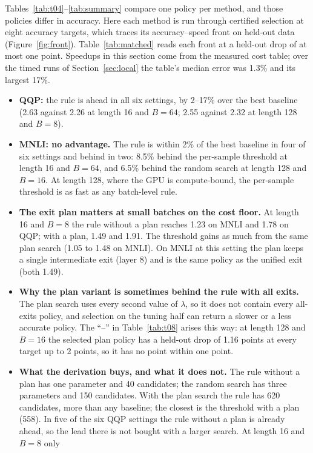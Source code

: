 Tables~\ref{tab:t04}--\ref{tab:summary} compare one policy per method, and those policies differ in accuracy. Here
each method is run through certified selection at eight accuracy targets, which traces its accuracy--speed front on
held-out data (Figure~\ref{fig:front}). Table~\ref{tab:matched} reads each front at a held-out drop of at most one
point. Speedups in this section come from the measured cost table; over the timed runs of Section~\ref{sec:local}
the table's median error was 1.3\% and its largest 17\%.
\begin{itemize}
  \item \textbf{QQP:} the rule is ahead in all six settings, by 2--17\% over the best baseline (2.63\x{} against
  2.26\x{} at length 16 and $B=64$; 2.55\x{} against 2.32\x{} at length 128 and $B=8$).
  \item \textbf{MNLI: no advantage.} The rule is within 2\% of the best baseline in four of six settings and behind
  in two: 8.5\% behind the per-sample threshold at length 16 and $B=64$, and 6.5\% behind the random search at length
  128 and $B=16$. At length 128, where the GPU is compute-bound, the per-sample threshold is as fast as any
  batch-level rule.
  \item \textbf{The exit plan matters at small batches on the cost floor.} At length 16 and $B=8$ the rule without a
  plan reaches 1.23\x{} on MNLI and 1.78\x{} on QQP; with a plan, 1.49\x{} and 1.91\x. The threshold gains as much
  from the same plan search (1.05\x{} to 1.48\x{} on MNLI). On MNLI at this setting the plan keeps a single
  intermediate exit (layer 8) and is the same policy as the unified exit (both 1.49\x).
  \item \textbf{Why the plan variant is sometimes behind the rule with all exits.} The plan search uses every second
  value of $\lambda$, so it does not contain every all-exits policy, and selection on the tuning half can return a
  slower or a less accurate policy. The ``--'' in Table~\ref{tab:t08} arises this way: at length 128 and $B=16$ the
  selected plan policy has a held-out drop of 1.16 points at every target up to 2 points, so it has no point within
  one point.
  \item \textbf{What the derivation buys, and what it does not.} The rule without a plan has one parameter and 40
  candidates; the random search has three parameters and 150 candidates. With the plan search the rule has 620
  candidates, more than any baseline; the closest is the threshold with a plan (558). In five of the six QQP settings the rule
  without a plan is already ahead, so the lead there is not bought with a larger search. At length 16 and $B=8$ only

\end{itemize}

